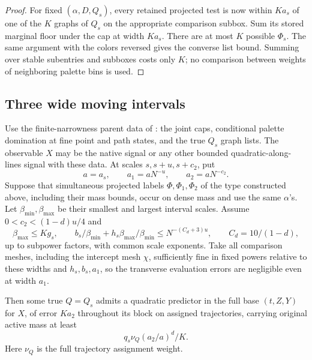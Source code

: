 \begin{proof}
For fixed \((\alpha,D,Q_s)\), every retained projected test is
now within \(Ka_s\) of one of the \(K\) graphs of \(Q_s\) on
the appropriate comparison subbox.  Sum its stored marginal floor
under the cap at width \(Ka_s\).  There are at most \(K\)
possible \(\Phi_s\).  The same argument with the colors reversed
gives the converse list bound.  Summing over stable subentries and
subboxes costs only \(K\); no comparison between weights of
neighboring palette bins is used.
\end{proof}

\subsection{Three wide moving intervals}

\begin{proposition}\label{prop:wide-interval}
Use the finite-narrowness parent data of
: the joint caps, conditional palette
domination at fine point and path states, and the true \(Q_s\)
graph lists.  The observable \(X\) may be the native signal or
any other bounded quadratic-along-lines signal with these data.
At scales \(s,s+u,s+c_2\), put
\[
 a=a_s,\qquad a_1=aN^{-u},\qquad a_2=aN^{-c_2}.
\]
Suppose that simultaneous projected labels
\(\Phi,\Phi_1,\Phi_2\) of the type constructed above, including
their mass bounds, occur on dense mass and use the same
\(\alpha\)'s.  Let \(\beta_{\min},\beta_{\max}\) be their
smallest and largest interval scales.  Assume
\(0<c_2<(1-d)u/4\) and
\[
 \beta_{\max}\le Kg_s,\qquad
 b_s/\beta_{\min}+h_s\beta_{\max}/\beta_{\min}
       \le N^{-(C_d+3)u},\qquad C_d=10/(1-d),
\]
up to subpower factors, with common scale exponents.  Take all
comparison meshes, including the intercept mesh \(\chi\),
sufficiently fine in fixed powers relative to these widths and
\(h_s,b_s,a_1\), so the transverse evaluation errors are
negligible even at width \(a_1\).

Then some true \(Q=Q_s\) admits a quadratic predictor in the
full base \((t,Z,Y)\) for \(X\), of error \(Ka_2\) throughout
its block on assigned trajectories, carrying original active mass
at least
\[
 q_s\nu_Q(a_2/a)^d/K.
\]
Here \(\nu_Q\) is the full trajectory assignment weight.

\end{proposition}
